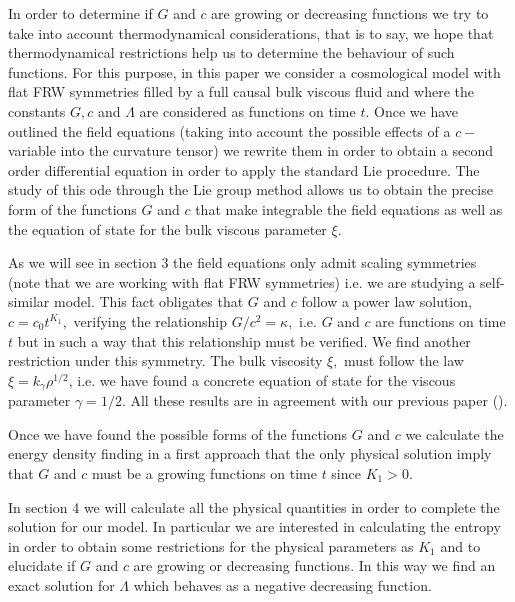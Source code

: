 \documentclass{revtex4}
\begin{document}
In order to determine if $G$ and $c$ are growing or decreasing functions we
try to take into account thermodynamical considerations, that is to say, we
hope that thermodynamical restrictions help us to determine the behaviour of
such functions. For this purpose, in this paper we consider a cosmological
model with flat FRW symmetries filled by a full causal bulk viscous fluid
and where the constants $G,c$ and $\Lambda $ are considered as functions on
time $t.$ Once we have outlined the field equations (taking into account the
possible effects of a $c-$variable into the curvature tensor) we rewrite
them in order to obtain a second order differential equation in order to
apply the standard Lie procedure. The study of this ode through the Lie
group method allows us to obtain the precise form of the functions $G$ and $%
c $ that make integrable the field equations as well as the equation of
state for the bulk viscous parameter $\xi .$

As we will see in section 3 the field equations only admit scaling
symmetries (note that we are working with flat FRW symmetries) i.e. we are
studying a self-similar model. This fact obligates that $G$ and $c$ follow a
power law solution, $c=c_{0}t^{K_{1}},$ verifying the relationship $%
G/c^{2}=\kappa ,$ i.e. $G$ and $c$ are functions on time $t$ but in such a
way that this relationship must be verified. We find another restriction
under this symmetry. The bulk viscosity $\xi ,$ must follow the law $\xi
=k_{\gamma }\rho ^{1/2}$, i.e. we have found a concrete equation of state
for the viscous parameter $\gamma =1/2.$ All these results are in agreement
with our previous paper (\cite{Tony2}).






Once we have found the possible forms of the functions $G$ and $c$ we
calculate the energy density finding in a first approach that the only
physical solution imply that $G$ and $c$ must be a growing functions on time
$t$ since $K_{1}>0.$

In section 4 we will calculate all the physical quantities in order to
complete the solution for our model. In particular we are interested in
calculating the entropy in order to obtain some restrictions for the
physical parameters as $K_{1}$ and to elucidate if $G$ and $c$ are growing
or decreasing functions. In this way we find an exact solution for $\Lambda $
which behaves as a negative decreasing function.
\end{document}
